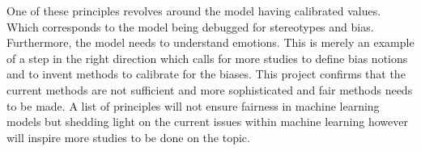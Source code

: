 \documentclass[11pt, fleqn, titlepage]{article}
\begin{document}
	\noindent
	One of these principles revolves around the model having calibrated values. Which corresponds to the model being debugged for stereotypes and bias. Furthermore, the model needs to understand emotions. This is merely an example of a step in the right direction which calls for more studies to define bias notions and to invent methods to calibrate for the biases. This project confirms that the current methods are not sufficient and more sophisticated and fair methods needs to be made. A list of principles will not ensure fairness in machine learning models but shedding light on the current issues within machine learning however will inspire more studies to be done on the topic.
	

	
\end{document}
